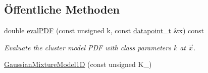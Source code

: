 \subsection*{Öffentliche Methoden}
\begin{DoxyCompactItemize}
\item 
double \hyperlink{classCDA_1_1GaussianMixtureModel1D_a0ee83653e92c833951631f300cfe338d}{evalPDF} (const unsigned k, const \hyperlink{classCDA_1_1GaussianMixtureModel1D_a72f70fc9a6a659f61bcaf74597d82aa7}{datapoint\_\-t} \&x) const 
\begin{DoxyCompactList}\small\item\em Evaluate the cluster model PDF with class parameters $k$ at $\vec{x}$. \item\end{DoxyCompactList}\item 
\hypertarget{classCDA_1_1GaussianMixtureModel1D_a31a8e94938ebe3e88f66bfbd5a90017f}{
\hyperlink{classCDA_1_1GaussianMixtureModel1D_a31a8e94938ebe3e88f66bfbd5a90017f}{GaussianMixtureModel1D} (const unsigned K\_\-)}
\label{classCDA_1_1GaussianMixtureModel1D_a31a8e94938ebe3e88f66bfbd5a90017f}


\end{DoxyCompactItemize}
